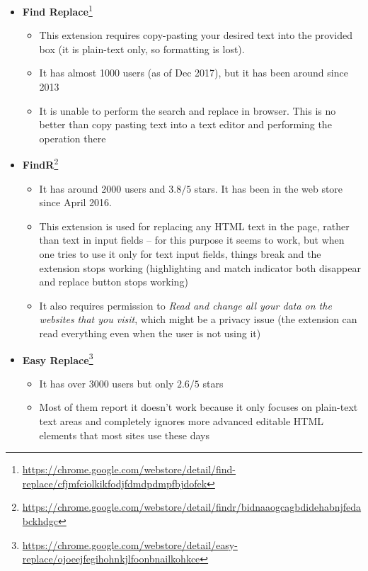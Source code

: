 \documentclass[bsc,frontabs,twoside,singlespacing,parskip,deptreport]{infthesis}
\providecommand{\tightlist}{%
  \setlength{\itemsep}{0pt}\setlength{\parskip}{0pt}}
\begin{document}
\begin{itemize}
\item
  {\bf Find Replace}\footnote{\href{https://chrome.google.com/webstore/detail/find-replace/cfjmfciolkikfodjfdmdpdmpfbjdofek}{https://chrome.google.com/webstore/detail/find-replace/cfjmfciolkikfodjfdmdpdmpfbjdofek}}
  \begin{itemize}
  \tightlist
\item
  This extension requires copy-pasting your desired text into the provided box (it is plain-text only, so formatting is lost).
\item
  It has almost 1000 users (as of Dec 2017), but it has been around since 2013
\item
  It is unable to perform the search and replace in browser. This is no better than copy pasting text into a text editor and performing the operation there
  \end{itemize}
\item
  \textbf{FindR}\footnote{\href{https://chrome.google.com/webstore/detail/findr/bidnaaogcagbdidehabnjfedabckhdgc}{https://chrome.google.com/webstore/detail/findr/bidnaaogcagbdidehabnjfedabckhdgc}}
  \begin{itemize}
  \tightlist
\item
  It has around 2000 users and $3.8/5$ stars. It has been in the web store since April 2016.
\item
  This extension is used for replacing any HTML text in the page, rather than text in input fields -- for this purpose it seems to work, but when one tries to use it only for text input fields, things break and the extension stops working (highlighting and match indicator both disappear and replace button stops working)
\item
  It also requires permission to \textit{Read and change all your data on the websites that you visit}, which might be a privacy issue (the extension can read everything even when the user is not using it)
  \end{itemize}
\item
  \textbf{Easy Replace}\footnote{\href{https://chrome.google.com/webstore/detail/easy-replace/ojoeejfegihohnkjlfoonbnailkohkce}{https://chrome.google.com/webstore/detail/easy-replace/ojoeejfegihohnkjlfoonbnailkohkce}}
  \begin{itemize}
  \tightlist
\item
  It has over 3000 users but only $2.6/5$ stars
\item
  Most of them report it doesn't work because it only focuses on plain-text text areas and completely ignores more advanced editable HTML elements that most sites use these days
  \end{itemize}
\end{itemize}
\end{document}
